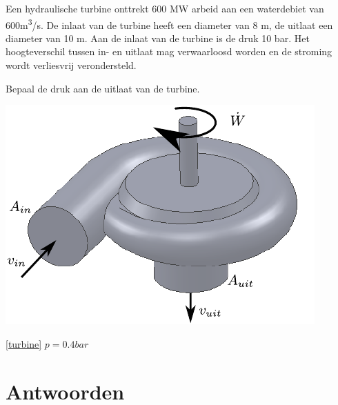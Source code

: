 \begin{toepassing}[*]
	\label{turbine}
Een hydraulische turbine onttrekt 600 MW arbeid aan een waterdebiet van 600\unit{m^3/s}. De inlaat van de turbine heeft een diameter van 8 m, de uitlaat een diameter van 10 m. Aan de inlaat van de turbine is de druk 10 bar. Het hoogteverschil tussen in- en uitlaat mag verwaarloosd worden en de stroming wordt verliesvrij verondersteld.

Bepaal de druk aan de uitlaat van de turbine.

	\centering
	\includegraphics{fig/behoudsvergelijkingen/turbine}
\end{toepassing}
\begin{antwoord}{\ref{turbine}}
	$p = 0.4\unit{bar}$
\end{antwoord}

\section*{Antwoorden}
	\begin{multicols}{2}
	\end{multicols}